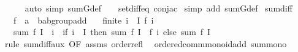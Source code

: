 \begin{isabellebody}
\ \ \ \ \isamarkupfalse%
\ {\isacharparenleft}{\kern0pt}auto\ simp{\isacharcolon}{\kern0pt}\ sum{\isachardot}{\kern0pt}G{\isacharunderscore}{\kern0pt}def\ {}\ {}\ {}\ set{\isacharunderscore}{\kern0pt}diff{\isacharunderscore}{\kern0pt}eq\ conj{\isacharunderscore}{\kern0pt}ac{\isacharparenright}{\kern0pt}\isanewline
{}\isamarkupfalse%
\ {\isacharparenleft}{\kern0pt}simp\ add{\isacharcolon}{\kern0pt}\ sum{\isachardot}{\kern0pt}G{\isacharunderscore}{\kern0pt}def{\isacharparenright}{\kern0pt}%
\endisatagproof
{\isafoldproof}%
%
\isadelimproof
\isanewline
%
\endisadelimproof
\isanewline
{}\isamarkupfalse%
\ sum{\isacharunderscore}{\kern0pt}diff{}{\isacharprime}{\kern0pt}{\isacharcolon}{\kern0pt}\isanewline
\ \ \ f\ {\isacharcolon}{\kern0pt}{\isacharcolon}{\kern0pt}\ {\isachardoublequoteopen}{\isacharprime}{\kern0pt}a\ {\isasymRightarrow}\ {\isacharprime}{\kern0pt}b{\isacharcolon}{\kern0pt}{\isacharcolon}{\kern0pt}ab{\isacharunderscore}{\kern0pt}group{\isacharunderscore}{\kern0pt}add{\isachardoublequoteclose}\isanewline
\ \ \ {\isachardoublequoteopen}finite\ {\isacharbraceleft}{\kern0pt}i\ {\isasymin}\ I{\isachardot}{\kern0pt}\ f\ i\ {\isasymnoteq}\ {}{\isacharbraceright}{\kern0pt}{\isachardoublequoteclose}\isanewline
\ \ \ {\isachardoublequoteopen}sum{\isacharprime}{\kern0pt}\ f\ {\isacharparenleft}{\kern0pt}I\ {\isacharminus}{\kern0pt}\ {\isacharbraceleft}{\kern0pt}i{\isacharbraceright}{\kern0pt}{\isacharparenright}{\kern0pt}\ {\isacharequal}{\kern0pt}\ {\isacharparenleft}{\kern0pt}if\ i\ {\isasymin}\ I\ then\ sum{\isacharprime}{\kern0pt}\ f\ I\ {\isacharminus}{\kern0pt}\ f\ i\ else\ sum{\isacharprime}{\kern0pt}\ f\ I{\isacharparenright}{\kern0pt}{\isachardoublequoteclose}\isanewline
%
\isadelimproof
\ \ %
\endisadelimproof
%
\isatagproof
{}\isamarkupfalse%
\ {\isacharparenleft}{\kern0pt}rule\ sum{\isacharunderscore}{\kern0pt}diff{}{\isacharprime}{\kern0pt}{\isacharunderscore}{\kern0pt}aux\ {\isacharbrackleft}{\kern0pt}OF\ assms\ order{\isacharunderscore}{\kern0pt}refl{\isacharbrackright}{\kern0pt}{\isacharparenright}{\kern0pt}%
\endisatagproof
{\isafoldproof}%
%
\isadelimproof
\isanewline
%
\endisadelimproof
\isanewline
{}\isamarkupfalse%
\ {\isacharparenleft}{\kern0pt}\ ordered{\isacharunderscore}{\kern0pt}comm{\isacharunderscore}{\kern0pt}monoid{\isacharunderscore}{\kern0pt}add{\isacharparenright}{\kern0pt}\ sum{\isacharunderscore}{\kern0pt}mono{\isacharcolon}{\kern0pt}\isanewline

\end{isabellebody}
